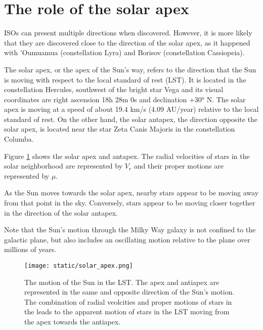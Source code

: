 \section{The role of the solar apex}

ISOs can present multiple directions when discovered. However, it is more likely
that they are discovered close to the direction of the solar apex, as it
happened with 'Oumuamua (constellation Lyra) and Borisov (constellation
Cassiopeia).

The solar apex, or the apex of the Sun's way, refers to the direction that the
Sun is moving with respect to the local standard of rest (LST). It is located in
the constellation Hercules, southwest of the bright star Vega and its visual
coordinates are right ascension 18h 28m 0s and declination +30° N. The solar
apex is moving at a speed of about 19.4 km/s (4.09 AU/year) relative to the
local standard of rest. On the other hand, the solar antapex, the direction
opposite the solar apex, is located near the star Zeta Canis Majoris in the
constellation Columba. 

Figure \ref{fig:solar_apex} shows the solar apex and antapex. The radial
velocities of stars in the solar neighborhood are represented by $V_r$ and their
proper motions are represented by $\mu$.

As the Sun moves towards the solar apex, nearby stars appear to be moving
away from that point in the sky. Conversely, stars appear to be moving closer
together in the direction of the solar antapex.

Note that the Sun's motion through the Milky Way galaxy is not confined to the
galactic plane, but also includes an oscillating motion relative to the plane
over millions of years.

\begin{figure}[H]
  \centering
  \texttt{[image: static/solar\_apex.png]}
        \caption[The motion of the Sun in the LST.]
        {
          The motion of the Sun in the LST. The apex and antiapex are
          represented in the same and opposite direction of the Sun's motion.
          The combination of radial veolcities and proper motions of stars in the
          leads to the apparent motion of stars in the LST moving from the apex
          towards the antiapex.
        }
\label{fig:solar_apex}
\end{figure}
